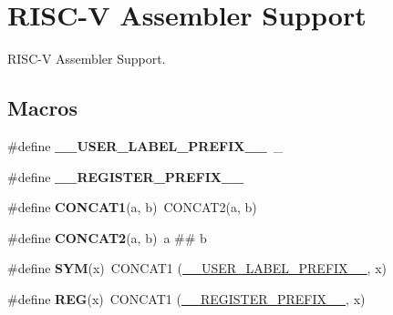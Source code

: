 \hypertarget{group__RTEMSScoreCPURISCVASM}{}\section{R\+I\+S\+C-\/V Assembler Support}
\label{group__RTEMSScoreCPURISCVASM}


R\+I\+S\+C-\/V Assembler Support.  


\subsection*{Macros}
\begin{DoxyCompactItemize}
\item 
\mbox{\label{group__RTEMSScoreCPURISCVASM_gaff6bf0ff0fa3b5cbd23a8ae1131c87a9}} 
\#define {\bfseries \+\_\+\+\_\+\+U\+S\+E\+R\+\_\+\+L\+A\+B\+E\+L\+\_\+\+P\+R\+E\+F\+I\+X\+\_\+\+\_\+}~\+\_\+
\item 
\mbox{\label{group__RTEMSScoreCPURISCVASM_ga08d4062230ffc8494f4be4f6447497e4}} 
\#define {\bfseries \+\_\+\+\_\+\+R\+E\+G\+I\+S\+T\+E\+R\+\_\+\+P\+R\+E\+F\+I\+X\+\_\+\+\_\+}
\item 
\mbox{\label{group__RTEMSScoreCPURISCVASM_gac1bd762df6f68795cfe6a980728bf233}} 
\#define {\bfseries C\+O\+N\+C\+A\+T1}(a,  b)~C\+O\+N\+C\+A\+T2(a, b)
\item 
\mbox{\label{group__RTEMSScoreCPURISCVASM_ga2fef427b1927dac8bf612d1384f00503}} 
\#define {\bfseries C\+O\+N\+C\+A\+T2}(a,  b)~a \#\# b
\item 
\mbox{\label{group__RTEMSScoreCPURISCVASM_gafe05d428a5f345f51fb591debb815325}} 
\#define {\bfseries S\+YM}(x)~C\+O\+N\+C\+A\+T1 (\mbox{\hyperlink{group__RTEMSScoreCPUx86-64ASM_gaff6bf0ff0fa3b5cbd23a8ae1131c87a9}{\+\_\+\+\_\+\+U\+S\+E\+R\+\_\+\+L\+A\+B\+E\+L\+\_\+\+P\+R\+E\+F\+I\+X\+\_\+\+\_\+}}, x)
\item 
\mbox{\label{group__RTEMSScoreCPURISCVASM_gacee196421e9a06f7700bb3064b13b37a}} 
\#define {\bfseries R\+EG}(x)~C\+O\+N\+C\+A\+T1 (\mbox{\hyperlink{group__RTEMSScoreCPUV850ASM_ga08d4062230ffc8494f4be4f6447497e4}{\+\_\+\+\_\+\+R\+E\+G\+I\+S\+T\+E\+R\+\_\+\+P\+R\+E\+F\+I\+X\+\_\+\+\_\+}}, x)

\end{DoxyCompactItemize}
